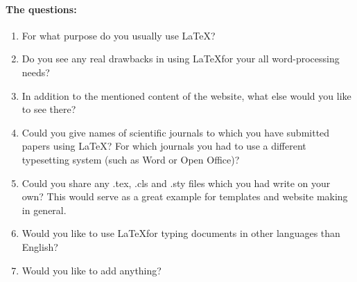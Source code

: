 \documentclass[a4paper]{article}
\begin{document}
\paragraph{The questions:}
\begin{enumerate}
    \item For what purpose do you usually use \LaTeX?
    \item Do you see any real drawbacks in using \LaTeX for your all
        word-processing needs?
    \item In addition to the mentioned content of the website, what else would
        you like to see there?
    \item Could you give names of scientific journals to which you have
        submitted papers using \LaTeX? For which journals you had to use a
        different typesetting system (such as Word or Open Office)?
    \item Could you share any .tex, .cls and .sty files which you had write on
        your own? This would serve as a great example for templates and website
        making in general.
    \item Would you like to use \LaTeX  for typing documents in other languages
        than English?
    \item Would you like to add anything?
\end{enumerate}
\end{document}
